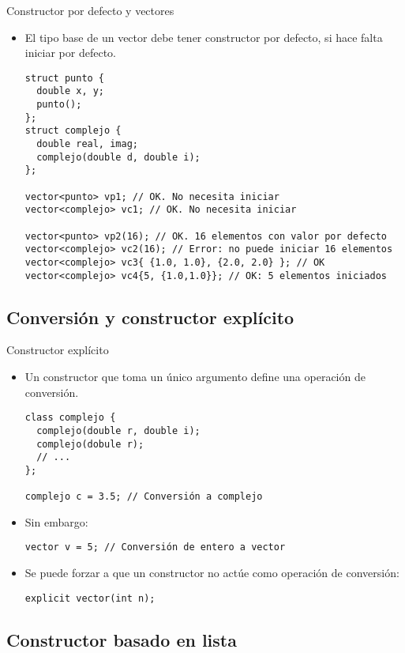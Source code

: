 \begin{frame}[fragile]{Constructor por defecto y vectores}
\begin{itemize}
  \item El tipo base de un vector debe tener constructor por defecto, si hace falta iniciar por defecto.
\begin{lstlisting}
struct punto {
  double x, y;
  punto();
};
struct complejo {
  double real, imag;
  complejo(double d, double i);
};

vector<punto> vp1; // OK. No necesita iniciar
vector<complejo> vc1; // OK. No necesita iniciar

vector<punto> vp2(16); // OK. 16 elementos con valor por defecto
vector<complejo> vc2(16); // Error: no puede iniciar 16 elementos
vector<complejo> vc3{ {1.0, 1.0}, {2.0, 2.0} }; // OK
vector<complejo> vc4{5, {1.0,1.0}}; // OK: 5 elementos iniciados
\end{lstlisting}
\end{itemize}
\end{frame}

\subsection{Conversión y constructor explícito}

\begin{frame}[fragile]{Constructor explícito}
\begin{itemize}
  \item Un constructor que toma un único argumento define una operación de conversión.
\begin{lstlisting}
class complejo {
  complejo(double r, double i);
  complejo(dobule r);
  // ...
};

complejo c = 3.5; // Conversión a complejo
\end{lstlisting}
  \item Sin embargo:
\begin{lstlisting}
vector v = 5; // Conversión de entero a vector
\end{lstlisting}
  \item Se puede forzar a que un constructor no actúe como operación de conversión:
\begin{lstlisting}
explicit vector(int n);
\end{lstlisting}
\end{itemize}
\end{frame}

\subsection{Constructor basado en lista}

